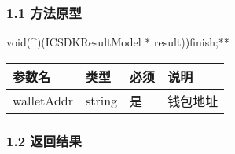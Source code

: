 \documentclass[letterpaper,10pt,english]{sphinxmanual}
\begin{document}
\subsubsection{1.1 方法原型}
\label{\detokenize{BCBWalletSDK_u63a5_u53e3_u8bf4_u660e:id36}}
\sphinxstylestrong{\textendash{}(}void(\textasciicircum{})(ICSDKResultModel * result))finish;**



\begin{savenotes}\sphinxattablestart
\centering
\begin{tabulary}{\linewidth}[t]{|T|T|T|T|}
\hline
\sphinxstyletheadfamily 
参数名
&\sphinxstyletheadfamily 
类型
&\sphinxstyletheadfamily 
必须
&\sphinxstyletheadfamily 
说明
\\
\hline
walletAddr
&
string
&
是
&
钱包地址
\\
\hline
\end{tabulary}
\par
\sphinxattableend\end{savenotes}


\subsubsection{1.2 返回结果}
\label{\detokenize{BCBWalletSDK_u63a5_u53e3_u8bf4_u660e:id37}}

\begin{sphinxVerbatim}[commandchars=\\\{\}]
     
     
\end{sphinxVerbatim}


\begin{sphinxVerbatim}[commandchars=\\\{\}]
     
\end{sphinxVerbatim}
\end{document}
